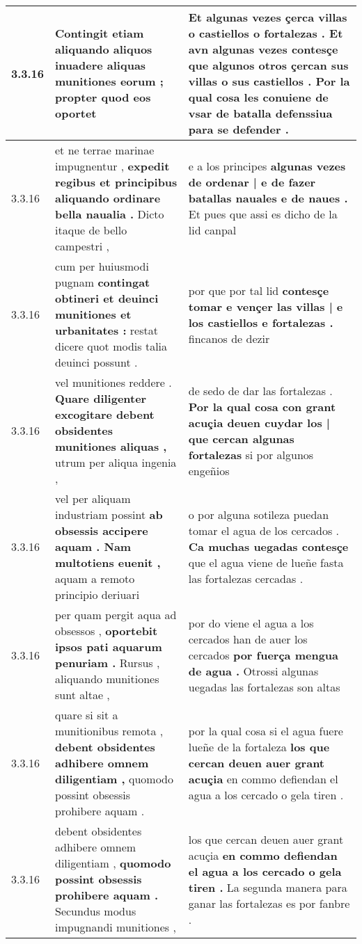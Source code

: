 \begin{tabular}{|p{1cm}|p{6.5cm}|p{6.5cm}|}
3.3.16 & Contingit etiam aliquando aliquos \textbf{ inuadere aliquas munitiones eorum ; } propter quod eos oportet & Et algunas vezes çerca villas o castiellos o fortalezas . \textbf{ Et avn algunas vezes contesçe que algunos otros çercan sus villas o sus castiellos . } Por la qual cosa les conuiene de vsar de batalla defenssiua para se defender . \\\hline
3.3.16 & et ne terrae marinae impugnentur , \textbf{ expedit regibus et principibus aliquando ordinare bella naualia . } Dicto itaque de bello campestri , & e a los principes \textbf{ algunas vezes de ordenar | e de fazer batallas nauales e de naues . } Et pues que assi es dicho de la lid canpal \\\hline
3.3.16 & cum per huiusmodi pugnam \textbf{ contingat obtineri et deuinci munitiones et urbanitates : } restat dicere quot modis talia deuinci possunt . & por que por tal lid \textbf{ contesçe tomar e vençer las villas | e los castiellos e fortalezas . } fincanos de dezir \\\hline
3.3.16 & vel munitiones reddere . \textbf{ Quare diligenter excogitare debent obsidentes munitiones aliquas , } utrum per aliqua ingenia , & de sedo de dar las fortalezas . \textbf{ Por la qual cosa con grant acuçia deuen cuydar los | que cercan algunas fortalezas } si por algunos engeñios \\\hline
3.3.16 & vel per aliquam industriam possint \textbf{ ab obsessis accipere aquam . Nam multotiens euenit , } aquam a remoto principio deriuari & o por alguna sotileza puedan tomar el agua de los cercados . \textbf{ Ca muchas uegadas contesçe } que el agua viene de lueñe fasta las fortalezas cercadas . \\\hline
3.3.16 & per quam pergit aqua ad obsessos , \textbf{ oportebit ipsos pati aquarum penuriam . } Rursus , aliquando munitiones sunt altae , & por do viene el agua a los cercados han de auer los cercados \textbf{ por fuerça mengua de agua . } Otrossi algunas uegadas las fortalezas son altas \\\hline
3.3.16 & quare si sit a munitionibus remota , \textbf{ debent obsidentes adhibere omnem diligentiam , } quomodo possint obsessis prohibere aquam . & por la qual cosa si el agua fuere lueñe de la fortaleza \textbf{ los que cercan deuen auer grant acuçia } en commo defiendan el agua a los cercado o gela tiren . \\\hline
3.3.16 & debent obsidentes adhibere omnem diligentiam , \textbf{ quomodo possint obsessis prohibere aquam . } Secundus modus impugnandi munitiones , & los que cercan deuen auer grant acuçia \textbf{ en commo defiendan el agua a los cercado o gela tiren . } La segunda manera para ganar las fortalezas es por fanbre . \\\hline

\end{tabular}
